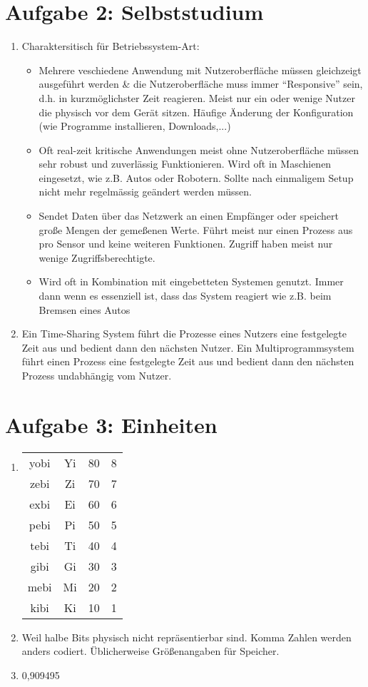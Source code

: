 \documentclass[a4paper,10pt]{article}
\begin{document}
\section*{Aufgabe 2: Selbststudium}
\begin{enumerate}
 \item Charaktersitisch für Betriebssystem-Art:
    \begin{itemize}
     \item Mehrere veschiedene Anwendung mit Nutzeroberfläche müssen gleichzeigt ausgeführt werden \& die Nutzeroberfläche muss immer ``Responsive'' sein, d.h. in kurzmöglichster Zeit reagieren. Meist nur ein oder wenige Nutzer die physisch vor dem Gerät sitzen. Häufige Änderung der Konfiguration (wie Programme installieren, Downloads,...)
     \item Oft real-zeit kritische Anwendungen meist ohne Nutzeroberfläche müssen sehr robust und zuverlässig Funktionieren. Wird oft in Maschienen eingesetzt, wie z.B. Autos oder Robotern. Sollte nach einmaligem Setup nicht mehr regelmässig geändert werden müssen.
     \item Sendet Daten über das Netzwerk an einen Empfänger oder speichert große Mengen der gemeßenen Werte. Führt meist nur einen Prozess aus pro Sensor und keine weiteren Funktionen. Zugriff haben meist nur wenige Zugriffsberechtigte.
     \item Wird oft in Kombination mit eingebetteten Systemen genutzt. Immer dann wenn es essenziell ist, dass das System reagiert wie z.B. beim Bremsen eines Autos
    \end{itemize}
    \item Ein Time-Sharing System führt die Prozesse eines Nutzers eine festgelegte Zeit aus und bedient dann den nächsten Nutzer. Ein Multiprogrammsystem führt einen Prozess eine festgelegte Zeit aus und bedient dann den nächsten Prozess undabhängig vom Nutzer.
\end{enumerate}

\section*{Aufgabe 3: Einheiten}
\begin{enumerate}
 \item 
 \begin{tabular}{c|c|c|c}
 yobi & Yi & 80 & 8 \\
 zebi & Zi & 70 & 7 \\
 exbi & Ei & 60 & 6 \\
 pebi & Pi & 50 & 5 \\
 tebi & Ti & 40 & 4 \\
 gibi & Gi & 30 & 3 \\
 mebi & Mi & 20 & 2 \\
 kibi & Ki & 10 & 1 \\
 \end{tabular}
\item Weil halbe Bits physisch nicht repräsentierbar sind. Komma Zahlen werden anders codiert. Üblicherweise Größenangaben für Speicher.
\item 0,909495
\end{enumerate}
\end{document}
